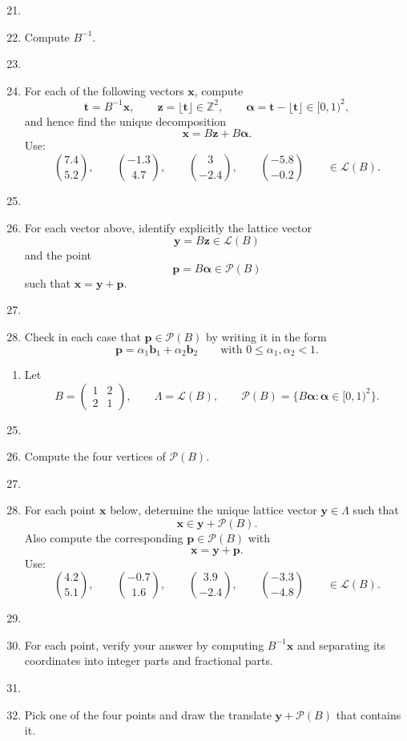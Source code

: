 \begin{enumerate}
	\setcounter{enumi}{20}
	\item[]
	\item Compute \(B^{-1}\).
	\item[]\item For each of the following vectors \(\mathbf x\), compute
	\[
	\mathbf t=B^{-1}\mathbf x,
	\qquad
	\mathbf z=\lfloor \mathbf t\rfloor\in\mathbb Z^2,
	\qquad
	\boldsymbol\alpha=\mathbf t-\lfloor \mathbf t\rfloor\in[0,1)^2,
	\]
	and hence find the unique decomposition
	\[
	\mathbf x=B\mathbf z+B\boldsymbol\alpha.
	\]
	Use:
	\[
	\binom{7.4}{5.2},
	\qquad
	\binom{-1.3}{4.7},
	\qquad
	\binom{3}{-2.4},
	\qquad
	\binom{-5.8}{-0.2}\qquad\in\mathcal{L}(B).
	\]
	\item[]\item For each vector above, identify explicitly the lattice vector
	\[
	\mathbf y=B\mathbf z\in\mathcal L(B)
	\]
	and the point
	\[
	\mathbf p=B\boldsymbol\alpha\in\mathcal P(B)
	\]
	such that \(\mathbf x=\mathbf y+\mathbf p\).
	\item[]\item Check in each case that \(\mathbf p\in\mathcal P(B)\) by writing it in the form
	\[
	\mathbf p=\alpha_1\mathbf b_1+\alpha_2\mathbf b_2
	\qquad\text{with }0\le \alpha_1,\alpha_2<1.
	\]
\end{enumerate}

\vfill

\begin{enumerate}
	\item[\textbf{25-28}] Let
	\[
	B=
	\begin{pmatrix}
		1&2\\
		2&1
	\end{pmatrix},
	\qquad
	\Lambda=\mathcal L(B),
	\qquad
	\mathcal P(B)=\{B\boldsymbol\alpha:\boldsymbol\alpha\in[0,1)^2\}.
	\]
\end{enumerate}

\medskip

\begin{enumerate}
	\setcounter{enumi}{24}
	\item[]\item Compute the four vertices of \(\mathcal P(B)\).
	\item[]\item For each point \(\mathbf x\) below, determine the unique lattice vector \(\mathbf y\in\Lambda\) such that
	\[
	\mathbf x\in \mathbf y+\mathcal P(B).
	\]
	Also compute the corresponding \(\mathbf p\in\mathcal P(B)\) with
	\[
	\mathbf x=\mathbf y+\mathbf p.
	\]
	Use:
	\[
	\binom{4.2}{5.1},
	\qquad
	\binom{-0.7}{1.6},
	\qquad
	\binom{3.9}{-2.4},
	\qquad
	\binom{-3.3}{-4.8}\qquad\in\mathcal L(B).
	\]
	\item[]\item For each point, verify your answer by computing \(B^{-1}\mathbf x\) and separating its coordinates into integer parts and fractional parts.
	\item[]\item Pick one of the four points and draw the translate \(\mathbf y+\mathcal P(B)\) that contains it.
\end{enumerate}

